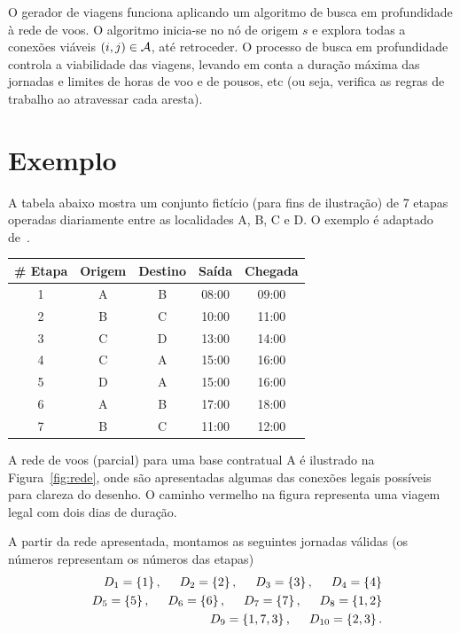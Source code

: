 O gerador de viagens funciona aplicando um algoritmo de busca em profundidade à rede de voos. O
algoritmo inicia-se no nó de origem $s$ e explora todas a conexões viáveis $(i, j) \in \mathcal{A}$, até
retroceder. O processo de busca em profundidade controla a viabilidade das viagens, levando em conta
a duração máxima das jornadas e limites de horas de voo e de pousos, etc (ou seja, verifica as 
regras de trabalho ao atravessar cada aresta).


\section{Exemplo}
\label{sec:exemplo}

A tabela abaixo mostra um conjunto fictício (para fins de ilustração) de 7 etapas operadas 
diariamente entre as localidades A, B, C e D. O exemplo é adaptado de~\cite{barnhart03}. 

\begin{table}[ht]
	\begin{center}
		\begin{tabular}{ccccc}
			{\bf \# Etapa} & {\bf Origem} & {\bf Destino} & {\bf Saída} & {\bf Chegada} \\ \hline
			1 & A & B & 08:00 & 09:00 \\
			2 & B & C & 10:00 & 11:00 \\
			3 & C & D & 13:00 & 14:00 \\
			4 & C & A & 15:00 & 16:00 \\
			5 & D & A & 15:00 & 16:00 \\
			6 & A & B & 17:00 & 18:00 \\
			7 & B & C & 11:00 & 12:00 \\
		\end{tabular}
	\end{center}
\end{table}

A rede de voos (parcial) para uma base contratual A é ilustrado na Figura~\ref{fig:rede}, onde são
apresentadas algumas das conexões legais possíveis para clareza do desenho. O caminho vermelho
na figura representa uma viagem legal com dois dias de duração. 

A partir da rede apresentada, montamos as seguintes jornadas válidas (os números representam os
números das etapas)
%
\begin{eqnarray*}
	&& D_1 = \{1\} \, , \hspace{0.5cm} D_2 = \{2\} \, , \hspace{0.5cm} D_3 = \{3\} \, , \hspace{0.5cm} D_4 = \{4\} \\
	&& D_5 = \{5\} \, , \hspace{0.5cm} D_6 = \{6\} \, , \hspace{0.5cm} D_7 = \{7\} \, , \hspace{0.5cm} D_8 = \{1, 2\} \\
	&& D_9 = \{1, 7 ,3\} \, , \hspace{0.5cm} D_{10} = \{2, 3\} \, . 
\end{eqnarray*}

